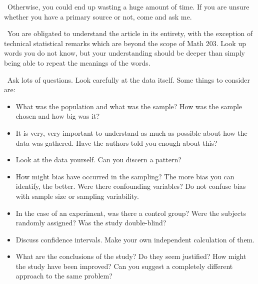 \vspace{0.2in}

\par{}\
Otherwise,
you could end up wasting a huge amount of time. If you are unsure whether
you have a primary source or not, come and ask me.

\vspace{0.2in}

\par{}\ You are obligated to
understand the article in its entirety, with the exception of technical
statistical remarks which are beyond the scope of Math 203.  Look up words
you do not know, but your understanding should be deeper than simply being
able to repeat the meanings of the words.

\vspace{0.2in}

\par{}\ Ask lots of questions.  Look
carefully at the data itself.  Some things to consider are:
\begin{itemize}
\item What was the population and what was the sample?  How was the sample
      chosen and how big was it?
\item It is very, very important to understand as much as possible about how
      the data was gathered.  Have the authors told you enough about this?
\item Look at the data yourself.  Can you discern a pattern?
\item How might bias have occurred in the sampling?  The more bias you can
      identify, the better.  Were there confounding variables?
      Do not confuse bias with sample size or sampling variability.
\item In the case of an experiment, was there a control group?  Were the
      subjects randomly assigned?  Was the study double-blind?
\item Discuss confidence intervals.  Make your own independent calculation
      of them.
\item What are the conclusions of the study?  Do they seem justified?  How
      might the study have been improved?  Can you suggest a completely
      different approach to the same problem?
\end{itemize}

\vspace{0.2in}

